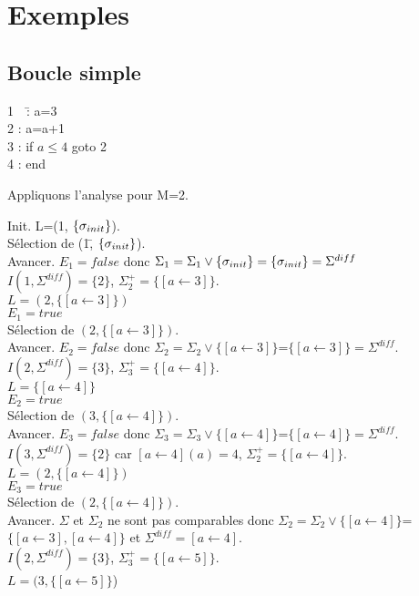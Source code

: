 \section{Exemples}
\subsection{Boucle simple}

\begin{tabbing}
1\ \  \=: a=3\\
2 \>: a=a+1\\
3 \>: if $a\leq 4$ goto 2\\
4 \>: end
\end{tabbing}

Appliquons l'analyse pour M=2.

\begin{tabbing}
Init. L=(1, $\{\sigma_{init}\}$).\\
Sélection de (1,\= $\{\sigma_{init}\}$).\\
Avancer. \> $E_1=false$ donc $\Sigma_1=\Sigma_1\vee\{\sigma_{init}\}=\{\sigma_{init}\}=\Sigma^{diff}$\\
\> $I(1,\Sigma^{diff})=\{2\}$, $\Sigma^+_2=\{[a\leftarrow 3]\}$.\\
\> $L=(2,\{[a\leftarrow 3]\})$\\
\> $E_1=true$\\

Sélection de $(2,\{[a\leftarrow 3]\})$.\\
Avancer. \> $E_2=false$ donc $\Sigma_2=\Sigma_2\vee\{[a\leftarrow 3]\}$=$\{[a\leftarrow 3]\}=\Sigma^{diff}$.\\
\> $I(2,\Sigma^{diff})=\{3\}$, $\Sigma^+_3=\{[a\leftarrow 4]\}$.\\
\> $L=\{[a\leftarrow 4]\}$\\
\> $E_2=true$\\

Sélection de $(3,\{[a\leftarrow 4]\})$.\\
Avancer. \> $E_3=false$ donc $\Sigma_3=\Sigma_3\vee\{[a\leftarrow 4]\}$=$\{[a\leftarrow 4]\}=\Sigma^{diff}$.\\
\> $I(3,\Sigma^{diff})=\{2\}$ car $[a\leftarrow 4](a)=4$, $\Sigma^+_2=\{[a\leftarrow 4]\}$.\\
\> $L=(2,\{[a\leftarrow 4]\})$\\
\> $E_3=true$\\

Sélection de $(2,\{[a\leftarrow 4]\})$.\\
Avancer. \> $\Sigma$ et $\Sigma_2$ ne sont pas comparables donc $\Sigma_2=\Sigma_2\vee\{[a\leftarrow 4]\}$=$\{[a\leftarrow 3],[a\leftarrow 4]\}$ et $\Sigma^{diff}=[a\leftarrow 4].$\\
\> $I(2,\Sigma^{diff})=\{3\}$, $\Sigma^+_3=\{[a\leftarrow 5]\}$.\\
\> $L=(3,\{[a\leftarrow 5]\}$)\\


\end{tabbing}

